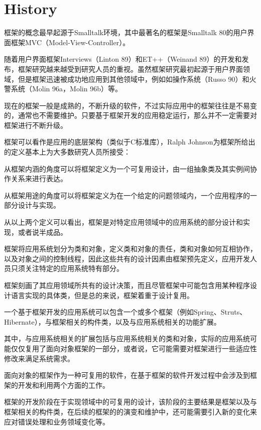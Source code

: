 \section{History}

框架的概念最早起源于Smalltalk环境，其中最著名的框架是Smalltalk 80的用户界面框架MVC（Model-View-Controller）。

随着用户界面框架Interviews（Linton 89）和ET++（Weinand 89）的开发和发布，框架研究越来越受到研究人员的重视。虽然框架研究最初起源于用户界面领域，但是框架迅速被成功地应用到其他领域中，例如如操作系统（Russo 90）和火警系统（Molin 96a，Molin 96b）等。



现在的框架一般是成熟的，不断升级的软件，不过实际应用中的框架往往是不易变的，通常也不需要维护。只要基于框架开发的应用稳定运行，那么并不一定需要对框架进行不断升级。

框架可以看作是应用的底层架构（类似于C标准库），Ralph Johnson为框架所给出的定义基本上为大多数研究人员所接受：


\begin{compactitem}
\item 从框架内涵的角度可以将框架定义为一个可复用设计，由一组抽象类及其实例间协作关系来进行表达。

\item 从框架用途的角度可以将框架定义为在一个给定的问题领域内，一个应用程序的一部分设计与实现。
\end{compactitem}

从以上两个定义可以看出，框架是对特定应用领域中的应用系统的部分设计和实现，或者说半成品。

框架将应用系统划分为类和对象，定义类和对象的责任，类和对象如何互相协作，以及对象之间的控制线程，因此这些共有的设计因素由框架预先定义，应用开发人员只须关注特定的应用系统特有部分。

框架刻画了其应用领域所共有的设计决策，而且尽管框架中可能包含用某种程序设计语言实现的具体类，但是总的来说，框架着重于设计复用。

一个基于框架开发的应用系统可以包含一个或多个框架（例如Spring、Struts、Hibernate），与框架相关的构件类，以及与应用系统相关的功能扩展。

其中，与应用系统相关的扩展包括与应用系统相关的类和对象，实际的应用系统可能仅仅复用了面向对象框架的一部分，或者说，它可能需要对框架进行一些适应性修改来满足系统需求。

面向对象的框架作为一种可复用的软件，在基于框架的软件开发过程中会涉及到框架的开发和利用两个方面的工作。

框架的开发阶段在于实现领域中的可复用的设计，该阶段的主要结果是框架以及与框架相关的构件类，在后续的框架的的演变和维护中，还可能需要引入新的变化来应对错误处理和业务领域变化等。


